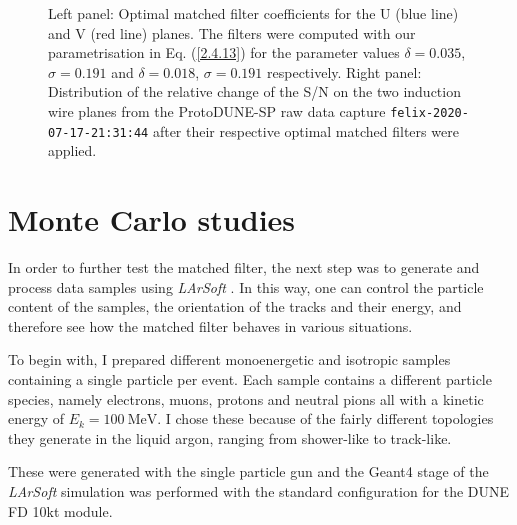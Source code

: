 \begin{figure}[t]
\begin{subfigure}{0.5\textwidth}
	\end{subfigure}
	\caption[Distribution of the relative change of the S/N on the induction planes from the ProtoDUNE-SP raw data capture after their respective optimal matched filters were applied.]{Left panel: Optimal matched filter coefficients for the U (blue line) and V (red line) planes. The filters were computed with our parametrisation in Eq. (\ref{2.4.13}) for the parameter values $\delta = 0.035$, $\sigma = 0.191$ and $\delta = 0.018$, $\sigma = 0.191$ respectively. Right panel: Distribution of the relative change of the S/N on the two induction wire planes from the ProtoDUNE-SP raw data capture \texttt{felix-2020-07-17-21:31:44} after their respective optimal matched filters were applied.}
	\label{fig:mf_perf}
\end{figure}

\section{Monte Carlo studies}
\label{sec:matched_filter_mc_studies}

In order to further test the matched filter, the next step was to generate and process data samples using \textit{LArSoft} \cite{Church2013}. In this way, one can control the particle content of the samples, the orientation of the tracks and their energy, and therefore see how the matched filter behaves in various situations.

To begin with, I prepared different monoenergetic and isotropic samples containing a single particle per event. Each sample contains a different particle species, namely electrons, muons, protons and neutral pions all with a kinetic energy of $E_{k} = 100 \ \mathrm{MeV}$. I chose these because of the fairly different topologies they generate in the liquid argon, ranging from shower-like to track-like.

These were generated with the single particle gun and the Geant4 stage of the \textit{LArSoft} simulation \cite{Church2013} was performed with the standard configuration for the DUNE FD 10kt module. 

